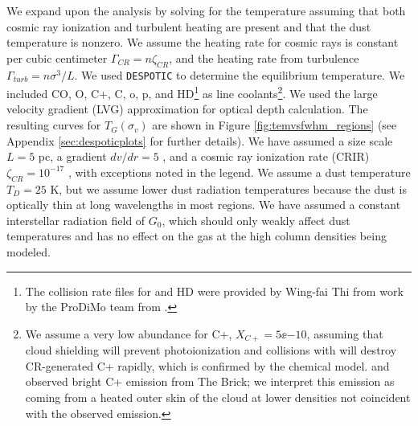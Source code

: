 We expand upon the \citet{Ao2013a} analysis by solving for the temperature
assuming that both cosmic ray ionization and turbulent heating are present and
that the dust temperature is nonzero.  We assume the heating rate for cosmic
rays is constant per cubic centimeter $\Gamma_{CR} = n \zeta_{CR}$, and the
heating rate from turbulence $\Gamma_{turb} = n \sigma^3 / L$.  We used
\texttt{DESPOTIC} \citep{Krumholz2014c} to determine the equilibrium
temperature.  We included CO, O, C+, C, o\hh, p\hh, and HD\footnote{The
collision rate files for \hh and HD were provided by Wing-fai Thi from work by
the ProDiMo team from
\citet{Le-Bourlot1999a,Wrathmall2007a,Flower2000a,Wolniewicz1998a}.} as line
coolants\footnote{We assume a very low abundance for C+, $X_{C+}=5\ee{-10}$,
assuming that cloud shielding will prevent photoionization and collisions with
\hh will destroy CR-generated C+ rapidly, which is confirmed by the
\citet{Nelson1999a} chemical model.  \citet{Lis1998a} and \citet{Lis1999a}
observed bright C+ emission from The Brick; we interpret this emission as
coming from a heated outer skin of the cloud at lower densities not coincident
with the observed \formaldehyde emission.}.  We used the large velocity
gradient (LVG) approximation for optical depth calculation.  The resulting
curves for $T_G(\sigma_v)$ are shown in Figure \ref{fig:temvsfwhm_regions} (see
Appendix \ref{sec:despoticplots} for further details).  We
have assumed a size scale $L=5$ pc, a gradient $dv/dr = 5$ \kms \perpc, and a
cosmic ray ionization rate (CRIR) $\zeta_{CR}=10^{-17}$ \pers, with exceptions
noted in the legend.  We assume a dust temperature $T_D=25$ K, but we assume
lower dust radiation temperatures because the dust is optically thin at long
wavelengths in most regions.  We have assumed a constant interstellar radiation
field of $G_0$, which should only weakly affect dust temperatures and has
no effect on the gas at the high column densities being modeled.


